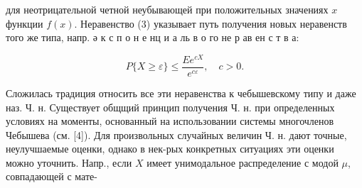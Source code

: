 \documentclass[10pt]{article}
\begin{document}
для неотрицательной четной неубывающей при положительных значениях $x$ функции $f(x)$. Неравенство (3) указывает путь получения новых неравенств того же типа, напр. ә к с п о н е нц и а ль в о го не р ав ен с т в а:



\[

P\{X \geqslant \varepsilon\} \leqslant \frac{E e^{c X}}{e^{c \varepsilon}}, \quad c>0 .

\]



Сложилась традиция относить все эти неравенства к чебышевскому типу и даже наз. Ч. н. Существует общщий принцип получения Ч. н. при определенных условиях на моменты, основанный на использовании системы многочленов Чебышева (см. [4]). Для произвольных случайных величин Ч. н. дают точные, неулучшаемые оценки, однако в нек-рых конкретных ситуациях эти оценки можно уточнить. Напр., если $X$ имеет унимодальное распределение с модой $\mu$, совпадающей с мате-
\end{document}
